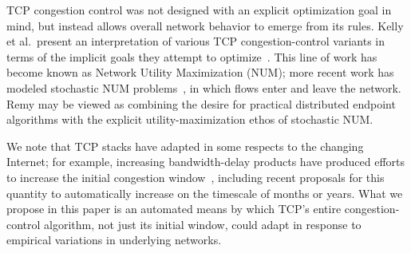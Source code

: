 TCP congestion control was not designed with an explicit optimization
goal in mind, but instead allows overall network behavior to emerge
from its rules. Kelly et al.~present an interpretation of various TCP
congestion-control variants in terms of the implicit goals they
attempt to optimize~\cite{Kelly98}.  This line of work has become
known as Network Utility Maximization (NUM); more recent work has
modeled stochastic NUM problems~\cite{stochasticnum}, in which flows
enter and leave the network. Remy may be viewed as combining the
desire for practical distributed endpoint algorithms with the explicit
utility-maximization ethos of stochastic NUM.

We note that TCP stacks have adapted in some respects to the changing
Internet; for example, increasing bandwidth-delay products have
produced efforts to increase the initial congestion
window~\cite{dukkipati2010argument,chu2012increasing}, including
recent proposals \cite{allman2010init,touch2012automating} for this
quantity to automatically increase on the timescale of months or
years. What we propose in this paper is an automated means by which
TCP's entire congestion-control algorithm, not just its initial
window, could adapt in response to empirical variations in underlying
networks.



